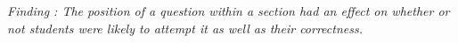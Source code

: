 {%

\textit{Finding : The position of a question within a section had an effect on whether or not students were likely to attempt it as well as their correctness.} 

}
